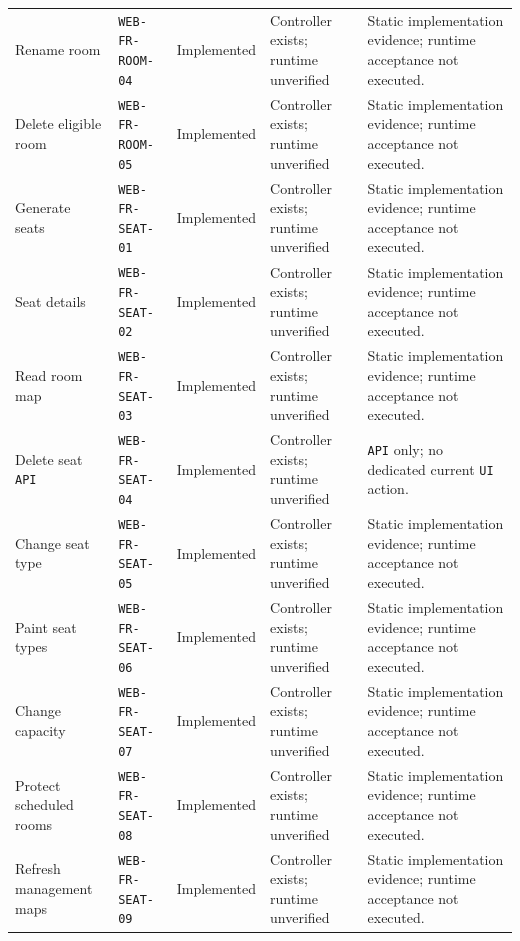 \begin{longtable}{@{}P{0.19000\SRSWidth}P{0.18000\SRSWidth}P{0.15000\SRSWidth}P{0.20000\SRSWidth}P{0.28000\SRSWidth}@{}}
Rename room & \texttt{WEB-\allowbreak{}FR-\allowbreak{}ROOM-\allowbreak{}04} & Implemented & Controller exists; runtime unverified & Static implementation evidence; runtime acceptance not executed. \\[3pt]
Delete eligible room & \texttt{WEB-\allowbreak{}FR-\allowbreak{}ROOM-\allowbreak{}05} & Implemented & Controller exists; runtime unverified & Static implementation evidence; runtime acceptance not executed. \\[3pt]
Generate seats & \texttt{WEB-\allowbreak{}FR-\allowbreak{}SEAT-\allowbreak{}01} & Implemented & Controller exists; runtime unverified & Static implementation evidence; runtime acceptance not executed. \\[3pt]
Seat details & \texttt{WEB-\allowbreak{}FR-\allowbreak{}SEAT-\allowbreak{}02} & Implemented & Controller exists; runtime unverified & Static implementation evidence; runtime acceptance not executed. \\[3pt]
Read room map & \texttt{WEB-\allowbreak{}FR-\allowbreak{}SEAT-\allowbreak{}03} & Implemented & Controller exists; runtime unverified & Static implementation evidence; runtime acceptance not executed. \\[3pt]
Delete seat \texttt{API} & \texttt{WEB-\allowbreak{}FR-\allowbreak{}SEAT-\allowbreak{}04} & Implemented & Controller exists; runtime unverified & \texttt{API} only; no dedicated current \texttt{UI} action. \\[3pt]
Change seat type & \texttt{WEB-\allowbreak{}FR-\allowbreak{}SEAT-\allowbreak{}05} & Implemented & Controller exists; runtime unverified & Static implementation evidence; runtime acceptance not executed. \\[3pt]
Paint seat types & \texttt{WEB-\allowbreak{}FR-\allowbreak{}SEAT-\allowbreak{}06} & Implemented & Controller exists; runtime unverified & Static implementation evidence; runtime acceptance not executed. \\[3pt]
Change capacity & \texttt{WEB-\allowbreak{}FR-\allowbreak{}SEAT-\allowbreak{}07} & Implemented & Controller exists; runtime unverified & Static implementation evidence; runtime acceptance not executed. \\[3pt]
Protect scheduled rooms & \texttt{WEB-\allowbreak{}FR-\allowbreak{}SEAT-\allowbreak{}08} & Implemented & Controller exists; runtime unverified & Static implementation evidence; runtime acceptance not executed. \\[3pt]
Refresh management maps & \texttt{WEB-\allowbreak{}FR-\allowbreak{}SEAT-\allowbreak{}09} & Implemented & Controller exists; runtime unverified & Static implementation evidence; runtime acceptance not executed. \\[3pt]

\end{longtable}
